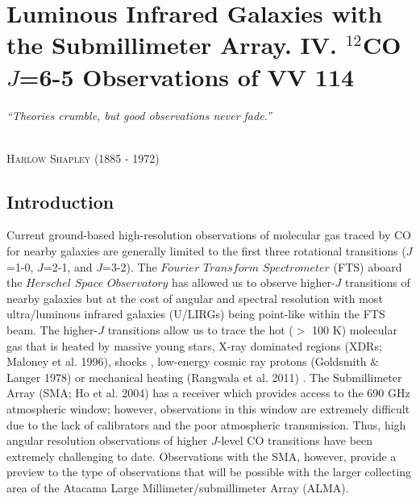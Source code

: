 \pagestyle{fancy}
\headheight 20pt
\chead{}
\lfoot{}
\cfoot{\thepage}
\rfoot{}
\renewcommand{\headrulewidth}{0.1pt}
\renewcommand{\footrulewidth}{0.1pt}
\setlength{\epigraphwidth}{5.in}
\chapter{Luminous Infrared Galaxies with the Submillimeter Array. IV. $^{12}$CO $J$=6-5 Observations of VV 114} \label{chapter2} 
\thispagestyle{fancy} 

\linespread{1.5}
\epigraph{%
\normalsize \textit{``Theories crumble, but good observations never fade.''}}
  {\normalsize \textsc{\\ Harlow Shapley} (1885 - 1972)}
  
\section{Introduction} %
Current ground-based high-resolution observations of molecular gas traced by CO for nearby galaxies are generally limited to the first three rotational transitions ($J$=1-0, $J$=2-1, and $J$=3-2).  The $Fourier$ $Transform$ $Spectrometer$ (FTS) aboard the $Herschel$ $Space$ $Observatory$ has allowed us to observe higher-$J$ transitions of nearby galaxies but at the cost of angular and spectral resolution with most ultra/luminous infrared galaxies (U/LIRGs) being point-like within the FTS beam. The higher-$J$ transitions allow us to trace the hot ($>$ 100 K) molecular gas that is heated by massive young stars, X-ray dominated regions (XDRs; Maloney et al. 1996)\nocite{1996ApJ...466..561M}, shocks \citep{2013ApJ...762L..16M}, low-energy cosmic ray protons (Goldsmith $\&$ Langer 1978) \nocite{1978ApJ...222..881G}or mechanical heating (Rangwala et al. 2011) \nocite{2011ApJ...743...94R}. The Submillimeter Array (SMA; Ho et al. 2004)  \nocite{2004ApJ...616L...1H} has a receiver which provides access to the 690 GHz atmospheric window; however, observations in this window are extremely difficult due to the lack of calibrators and the poor atmospheric transmission. Thus, high angular resolution observations of higher $J$-level CO transitions have been extremely challenging to date.  Observations with the SMA, however, provide a preview to the type of observations that will be possible with the larger collecting area of the Atacama Large Millimeter/submillimeter Array (ALMA).

